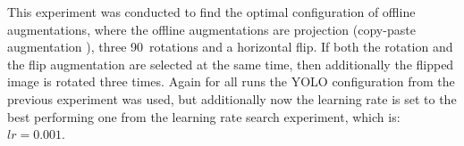 This experiment was conducted to find the optimal configuration of offline augmentations, where the offline augmentations are projection (copy-paste augmentation \cite{copypaste_aug}), three 90\textdegree\ rotations and a horizontal flip.
If both the rotation and the flip augmentation are selected at the same time, then additionally the flipped image is rotated three times.
Again for all runs the YOLO configuration from the previous experiment was used, but additionally now the learning rate is set to the best performing one from the learning rate search experiment, which is: $lr = 0.001$.




